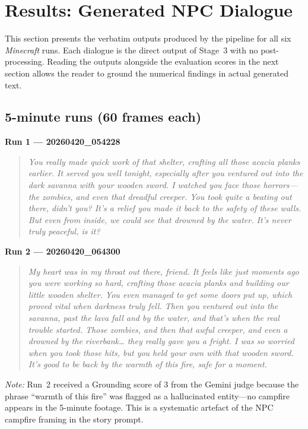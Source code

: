 \documentclass{article}
\begin{document}
\section{Results: Generated NPC Dialogue}

This section presents the verbatim outputs produced by the pipeline for all six \emph{Minecraft} runs. Each dialogue is the direct output of Stage~3 with no post-processing. Reading the outputs alongside the evaluation scores in the next section allows the reader to ground the numerical findings in actual generated text.

\subsection{5-minute runs (60 frames each)}

\textbf{Run 1 --- 20260420\_054228}
\begin{quote}\itshape
You really made quick work of that shelter, crafting all those acacia planks earlier.
It served you well tonight, especially after you ventured out into the dark savanna
with your wooden sword. I watched you face those horrors---the zombies, and even that
dreadful creeper. You took quite a beating out there, didn't you? It's a relief you
made it back to the safety of these walls. But even from inside, we could see that
drowned by the water. It's never truly peaceful, is it?
\end{quote}

\textbf{Run 2 --- 20260420\_064300}
\begin{quote}\itshape
My heart was in my throat out there, friend. It feels like just moments ago you were
working so hard, crafting those acacia planks and building our little wooden shelter.
You even managed to get some doors put up, which proved vital when darkness truly fell.
Then you ventured out into the savanna, past the lava fall and by the water, and
that's when the real trouble started. Those zombies, and then that awful creeper, and
even a drowned by the riverbank\ldots{} they really gave you a fright. I was so worried
when you took those hits, but you held your own with that wooden sword. It's good to
be back by the warmth of this fire, safe for a moment.
\end{quote}

\noindent\textit{Note:} Run~2 received a Grounding score of 3 from the Gemini judge because the phrase ``warmth of this fire'' was flagged as a hallucinated entity---no campfire appears in the 5-minute footage. This is a systematic artefact of the NPC campfire framing in the story prompt.
\end{document}
